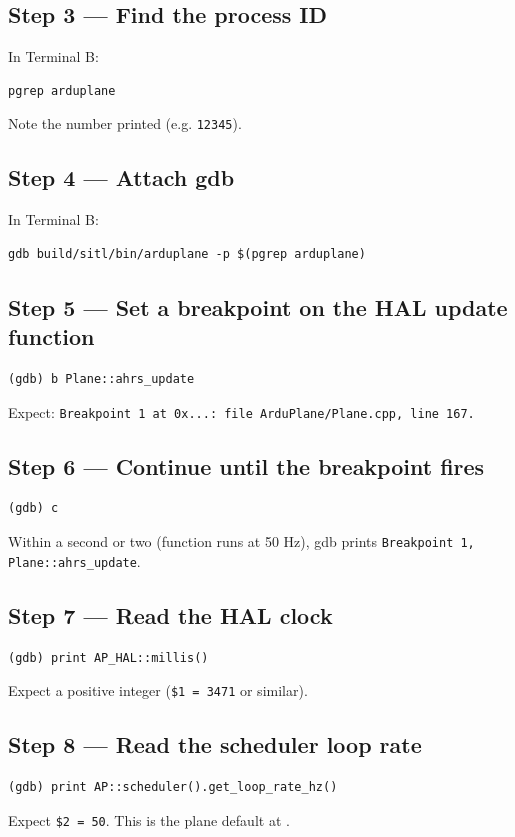 \documentclass[a4paper,11pt,twoside]{article}
\begin{document}
\subsection*{Step 3 --- Find the process ID}
In Terminal B:
\begin{Verbatim}[frame=single,fontsize=\small]
pgrep arduplane
\end{Verbatim}
Note the number printed (e.g. \texttt{12345}).

\subsection*{Step 4 --- Attach gdb}
In Terminal B:
\begin{Verbatim}[frame=single,fontsize=\small]
gdb build/sitl/bin/arduplane -p $(pgrep arduplane)
\end{Verbatim}

\subsection*{Step 5 --- Set a breakpoint on the HAL update function}
\begin{Verbatim}[frame=single,fontsize=\small]
(gdb) b Plane::ahrs_update
\end{Verbatim}
Expect: \texttt{Breakpoint 1 at 0x...: file ArduPlane/Plane.cpp, line 167.}

\subsection*{Step 6 --- Continue until the breakpoint fires}
\begin{Verbatim}[frame=single,fontsize=\small]
(gdb) c
\end{Verbatim}
Within a second or two (function runs at 50 Hz), gdb prints \texttt{Breakpoint 1, Plane::ahrs\_update}.

\subsection*{Step 7 --- Read the HAL clock}
\begin{Verbatim}[frame=single,fontsize=\small]
(gdb) print AP_HAL::millis()
\end{Verbatim}
Expect a positive integer (\texttt{\$1 = 3471} or similar).

\subsection*{Step 8 --- Read the scheduler loop rate}
\begin{Verbatim}[frame=single,fontsize=\small]
(gdb) print AP::scheduler().get_loop_rate_hz()
\end{Verbatim}
Expect \texttt{\$2 = 50}. This is the plane default at .
\end{document}
